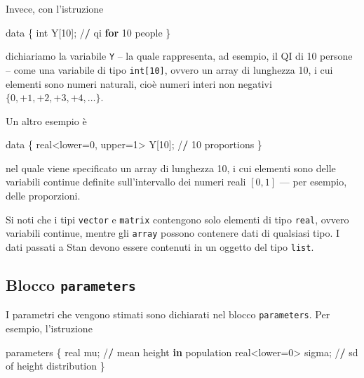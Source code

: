 \documentclass[
  11pt,
]{krantz}
\makeatletter
\newenvironment{Shaded}{\begin{snugshade}}{\end{snugshade}}
\newcommand{\ControlFlowTok}[1]{\textcolor[rgb]{0.27,0.27,0.27}{\textbf{#1}}}
\newcommand{\DecValTok}[1]{\textcolor[rgb]{0.06,0.06,0.06}{#1}}
\newcommand{\ErrorTok}[1]{\textcolor[rgb]{0.14,0.14,0.14}{\textbf{#1}}}
\newcommand{\NormalTok}[1]{#1}
\newcommand{\OtherTok}[1]{\textcolor[rgb]{0.37,0.37,0.37}{#1}}
\newcommand{\SpecialCharTok}[1]{\textcolor[rgb]{0,0,0}{#1}}
\newenvironment{kframe}{%
\medskip{}
\setlength{\fboxsep}{.8em}
 \def\at@end@of@kframe{}%
 \ifinner\ifhmode%
  \def\at@end@of@kframe{\end{minipage}}%
  \begin{minipage}{\columnwidth}%
 \fi\fi%
 \def\FrameCommand##1{\hskip\@totalleftmargin \hskip-\fboxsep
 \colorbox{shadecolor}{##1}\hskip-\fboxsep
     \hskip-\linewidth \hskip-\@totalleftmargin \hskip\columnwidth}%
 \MakeFramed {\advance\hsize-\width
   \@totalleftmargin\z@ \linewidth\hsize
   \@setminipage}}%
 {\par\unskip\endMakeFramed%
 \at@end@of@kframe}
\renewenvironment{Shaded}{\begin{kframe}}{\end{kframe}}
\theoremstyle{definition}
\theoremstyle{definition}
\theoremstyle{definition}
\theoremstyle{definition}
\theoremstyle{remark}
\makeatother
\begin{document}
Invece, con l'istruzione

\begin{Shaded}
\begin{Highlighting}[]
\NormalTok{data \{}
\NormalTok{  int Y[}\DecValTok{10}\NormalTok{]; }\SpecialCharTok{/}\ErrorTok{/}\NormalTok{ qi }\ControlFlowTok{for} \DecValTok{10}\NormalTok{ people}
\NormalTok{\}}
\end{Highlighting}
\end{Shaded}

dichiariamo la variabile \texttt{Y} -- la quale rappresenta, ad esempio, il QI di 10 persone -- come una variabile di tipo \texttt{int{[}10{]}}, ovvero un array di lunghezza 10, i cui elementi sono numeri naturali, cioè numeri interi non negativi \(\{0, +1, +2, +3, +4, \dots\}\).

Un altro esempio è

\begin{Shaded}
\begin{Highlighting}[]
\NormalTok{data \{}
\NormalTok{  real}\SpecialCharTok{\textless{}}\NormalTok{lower}\OtherTok{=}\DecValTok{0}\NormalTok{, upper}\OtherTok{=}\DecValTok{1}\SpecialCharTok{\textgreater{}}\NormalTok{ Y[}\DecValTok{10}\NormalTok{]; }\SpecialCharTok{/}\ErrorTok{/} \DecValTok{10}\NormalTok{ proportions}
\NormalTok{\}}
\end{Highlighting}
\end{Shaded}

nel quale viene specificato un array di lunghezza 10, i cui elementi sono delle variabili continue definite sull'intervallo dei numeri reali \([0, 1]\) --- per esempio, delle proporzioni.

Si noti che i tipi \texttt{vector} e \texttt{matrix} contengono solo elementi di tipo \texttt{real}, ovvero variabili continue, mentre gli \texttt{array} possono contenere dati di qualsiasi tipo. I dati passati a Stan devono essere contenuti in un oggetto del tipo \texttt{list}.

\hypertarget{blocco-parameters}{%
\subsection{\texorpdfstring{Blocco \texttt{parameters}}{Blocco parameters}}\label{blocco-parameters}}

I parametri che vengono stimati sono dichiarati nel blocco \texttt{parameters}. Per esempio, l'istruzione

\begin{Shaded}
\begin{Highlighting}[]
\NormalTok{parameters \{}
\NormalTok{  real mu; }\SpecialCharTok{/}\ErrorTok{/}\NormalTok{ mean height }\ControlFlowTok{in}\NormalTok{ population}
\NormalTok{  real}\SpecialCharTok{\textless{}}\NormalTok{lower}\OtherTok{=}\DecValTok{0}\SpecialCharTok{\textgreater{}}\NormalTok{ sigma; }\SpecialCharTok{/}\ErrorTok{/}\NormalTok{ sd of height distribution}
\NormalTok{\}}
\end{Highlighting}
\end{Shaded}
\end{document}
